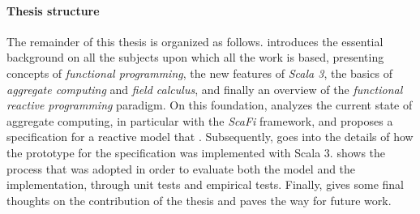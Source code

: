 \paragraph{Thesis structure}

The remainder of this thesis is organized as follows.
%
 introduces the essential background on all the subjects upon which all the work is based, presenting concepts of \textit{functional programming}, the new features of \textit{Scala 3}, the basics of \textit{aggregate computing} and \textit{field calculus}, and finally an overview of the \textit{functional reactive programming} paradigm.
%
On this foundation,  analyzes the current state of aggregate computing, in particular with the \textit{ScaFi} framework, and proposes a specification for a reactive model that .
%
Subsequently,  goes into the details of how the prototype for the specification was implemented with Scala 3.
%
 shows the process that was adopted in order to evaluate both the model and the implementation, through unit tests and empirical tests.
%
Finally,  gives some final thoughts on the contribution of the thesis and paves the way for future work.